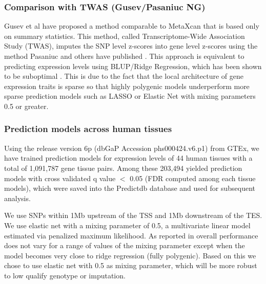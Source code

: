 \documentclass[10pt]{article}
\begin{document}

\subsubsection*{Comparison with TWAS (Gusev/Pasaniuc NG)}

Gusev et al have proposed a method comparable to MetaXcan that is based only on summary statistics. This method, called Transcriptome-Wide Association Study (TWAS), imputes the SNP level z-scores into gene level z-scores using the method Pasaniuc and others have published \cite{Pasaniuc2014}. This approach is equivalent to predicting expression levels using BLUP/Ridge Regression, which has been shown to be suboptimal \cite{Wheeler2016}. This is due to the fact that the local architecture of gene expression traits is sparse so that highly polygenic models underperform more sparse prediction models such as LASSO or Elastic Net with mixing parameters 0.5 or greater.

\subsubsection*{Prediction models across human tissues}

Using the release version 6p (dbGaP Accession phs000424.v6.p1) from GTEx, we have trained prediction models for expression levels of 44 human tissues with a total of 1,091,787 gene tissue pairs. Among these 203,494 yielded prediction models with cross validated q value $<$ 0.05 (FDR computed among each tissue models), which were saved into the Predictdb database and used for subsequent analysis.

We use SNPs within 1Mb upstream of the TSS and 1Mb downstream of the TES. We use elastic net with a mixing parameter of 0.5, a multivariate linear model estimated via penalized maximum likelihood. As reported in \cite{Gamazon2015,Wheeler2016} overall performance does not vary for a range of values of the mixing parameter except when the model becomes very close to ridge regression (fully polygenic). Based on this we chose to use elastic net with 0.5 as mixing parameter, which will be more robust to low qualify genotype or imputation.
\end{document}
